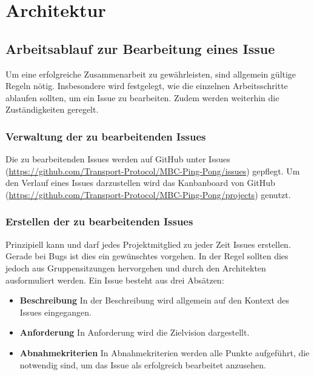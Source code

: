 \chapter{Architektur}

\section{Arbeitsablauf zur Bearbeitung eines Issue}
Um eine erfolgreiche Zusammenarbeit zu gewährleisten, sind allgemein gültige Regeln nötig. Insbesondere wird festgelegt, wie die einzelnen Arbeitsschritte ablaufen sollten, um ein Issue zu bearbeiten. Zudem werden weiterhin die Zuständigkeiten geregelt.

\subsection{Verwaltung der zu bearbeitenden Issues}
Die zu bearbeitenden Issues werden auf GitHub unter Issues (\href{https://github.com/Transport-Protocol/MBC-Ping-Pong/issues}{https://github.com/Transport-Protocol/MBC-Ping-Pong/issues}) gepflegt. Um den Verlauf eines Issues darzustellen wird das Kanbanboard von GitHub (\href{https://github.com/Transport-Protocol/MBC-Ping-Pong/projects}{https://github.com/Transport-Protocol/MBC-Ping-Pong/projects}) genutzt.

\subsection{Erstellen der zu bearbeitenden Issues}
Prinzipiell kann und darf jedes Projektmitglied zu jeder Zeit Issues erstellen. Gerade bei Bugs ist dies ein gewünschtes vorgehen. In der Regel sollten dies jedoch aus Gruppensitzungen hervorgehen und durch den Architekten ausformuliert werden.\newline
Ein Issue besteht aus drei Absätzen:
\begin{itemize}
	\item \textbf{Beschreibung} \newline
	In der Beschreibung wird allgemein auf den Kontext des Issues eingegangen.
	\item \textbf{Anforderung} \newline
	In Anforderung wird die Zielvision dargestellt.
	\item \textbf{Abnahmekriterien} \newline
	In Abnahmekriterien werden alle Punkte aufgeführt, die notwendig sind, um das Issue als erfolgreich bearbeitet anzusehen.
\end{itemize}

